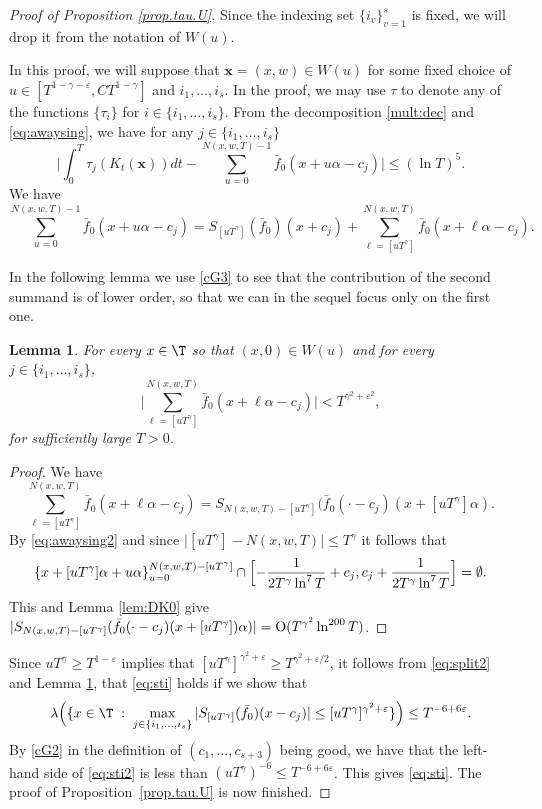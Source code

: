\documentclass[10pt]{amsart}
\let\DS\relax
\newcommand\bx{\boldsymbol{x}}
\let\eps\varepsilon
\theoremstyle{definition}
\theoremstyle{plain}
\newtheorem{lemma}[definition]{Lemma}
\begin{document}
\begin{proof}[Proof of Proposition \ref{prop.tau.U}]
Since the indexing set $\{i_v\}_{v=1}^s$ is fixed, we will drop it from the notation of $W(u)$.

In this proof, we will suppose that $\bx=(x,w)\in W(u)$ for some fixed choice of $u\in [T^{1-\gamma-\eps},CT^{1-\gamma}]$ and $i_1,\ldots,i_s$.
In the proof, we may use $\tau$ to denote any of the functions $\{\tau_i\}$ for $i\in \{i_1,\ldots,i_s\}$. From the decomposition \eqref{mult:dec} and \eqref{eq:awaysing}, we have for any $j \in \{i_1,\ldots,i_s\}$
\begin{equation*}%
\biggl|\int_{0}^T\tau_j(K_t(\bx))dt- \sum_{u=0}^{N(x,w,T)-1}\bar{f}_0(x+u\alpha-c_j) \biggr|\leq (\ln T)^5.
\end{equation*}
We have
\begin{equation}\label{eq:split2}
\sum_{u=0}^{N(x,w,T)-1}\bar{f}_0(x+u\alpha-c_j)=S_{[uT^\gamma]}(\bar{f}_0)(x+c_j)+
\sum^{{ N(x,w,T)}}_{{ \ell=[uT^\gamma]}}\bar{f}_0(x+\ell\alpha-c_j).
\end{equation}

In the following lemma we use \eqref{cG3} to see that the contribution of the second summand is of lower order, so that we can in the sequel focus only on the first one.
\begin{lemma}\label{lem:lowo} For every $x\in \T$ so that $ (x, 0)\in W(u)$ and for every $j\in \{i_1,\ldots, i_s\}$,
\[
\biggl |\sum_{\ell=[uT^\gamma]}^{N(x,w,T)}\bar{f}_0(x+\ell\alpha-c_j) \biggr |<T^{\gamma^2+\eps^2},
\]
for sufficiently large $T>0$.
\end{lemma}
\begin{proof}
We have
\[
\sum_{\ell=[uT^\gamma]}^{N(x,w,T)}\bar{f}_0(x+\ell\alpha-c_j)=S_{N(x,w,T)-[uT^\gamma]}(\bar{f}_0(\cdot-c_j)(x+[uT^\gamma]\alpha).
\]
By \eqref{eq:awaysing2} and since $\bigl|[uT^\gamma]-N(x,w,T)\bigr|\leq T^\gamma$ it follows that
\[
\left\{x+[uT^\gamma]\alpha+u\alpha\right\}_{u=0}^{N(x,w,T)-[uT^\gamma]}\cap
\Bigl[-\frac{1}{2T^\gamma\ln^{7}T}+ c_j, c_j+\frac{1}{2T^\gamma\ln^{7}T}\Bigr]=\emptyset.
\]
This and Lemma \ref{lem:DK0} give
$\DS
|S_{N(x,w,T)-[uT^\gamma]}(\bar{f}_0(\cdot-c_j)(x+[uT^\gamma])\alpha)|={\rm O} (T^{\gamma^2}\ln^{200}T)$.
\end{proof}

Since $uT^\gamma \geq T^{1-\eps}$ implies that $[uT^\gamma]^{\gamma^2+\eps}\geq T^{\gamma^2+\eps/2}$, it follows from \eqref{eq:split2} and Lemma \ref{lem:lowo}, that \eqref{eq:sti} holds if we show that
\begin{equation}\label{eq:sti2}
\lambda\Big(\{x\in \T\;:\; \max_{j \in \{i_1,\ldots,i_s\}} |S_{[uT^\gamma]}(\bar{f}_0)(x-c_j)|\leq [uT^\gamma]^{\gamma^2+\eps}\}\Big)\leq T^{-6+6\eps}.
\end{equation}
By \eqref{cG2} in the definition of $(c_{1},\ldots, c_{s+3})$ being good, we have that the left-hand side of \eqref{eq:sti2} is less than $ (uT^\gamma)^{-6}\leq T^{-6+6\eps}$. This gives \eqref{eq:sti}. The proof of Proposition~\ref{prop.tau.U} is now finished.
\end{proof}
\end{document}
